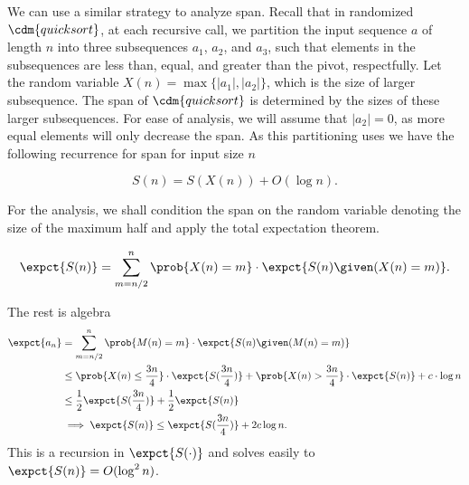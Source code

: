 {We can use a similar strategy to analyze span.
%
Recall that in randomized $\cdm{\qsort{}}$, at each recursive call, we
partition the input sequence $a$ of length $n$ into three subsequences
$a_1$, $a_2$, and $a_3$, such that elements in the subsequences are
less than, equal, and greater than the pivot, respectfully.  
%
Let the random variable $X(n)
= \max\{|a_1|, |a_2|\}$, which is the size of larger subsequence. 
%
The span of $\cdm{\qsort{}}$ is determined by the sizes of these larger
subsequences. For ease of analysis, we will assume that $|a_2| = 0$, as
more equal elements will only decrease the span. As this partitioning
uses  we have the following recurrence for span for input
size $n$

\[ 
S(n) = S(X(n)) + O(\log n). 
\]

For the analysis, we shall condition the span on the random variable
denoting the size of the maximum half and apply the total expectation
theorem.

\[
\expct{S(n)} = \sum_{m=n/2}^{n}{\prob{X(n)=m} \cdot \expct{S(n) \given (X(n)=m)}}.
\]

The rest is algebra
\begin{align*}
\expct{a_n} 
&=  \sum_{m=n/2}^{n}{\prob{M(n)=m} \cdot \expct{S(n) \given (M(n)=m)}}
\\
&\leq 
\prob{X(n) \leq \frac{3n}{4}} \cdot \expct{S({\frac{3n}{4}})} + 
\prob{X(n) > \frac{3n}{4}} \cdot \expct{S(n)} + c\cdot \log n
\\
&\leq \frac{1}{2} \expct{S({\frac{3n}{4}})} + \frac{1}{2} \expct{S(n)}
\\
&\implies \expct{S(n)} \leq \expct{S(\frac{3n}{4})} + 2c \log n.
\\
\end{align*}
This is a recursion in $\expct{S(\cdot)}$ and solves easily to 
 $\expct{S(n)} = O(\log^2 n)$.



}
